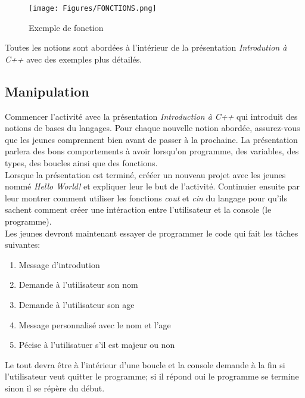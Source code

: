 \documentclass[]{report}
\begin{document}
\begin{adjustwidth}{1.5cm}{0cm}
\begin{figure}[!h]
	\centering
	\texttt{[image: Figures/FONCTIONS.png]}
	\caption{Exemple de fonction}
	\label{hw:fig:fonctions}
\end{figure}

Toutes les notions sont abordées à l'intérieur de la présentation \textit{Introdution à C++} avec des exemples plus détailés.
\subsection*{\Large{Manipulation}}
\vspace{-5mm}\makebox[0.917\textwidth]{\hrulefill}\vspace{3mm}

Commencer l'activité avec la présentation \textit{Introduction à C++} qui introduit des notions de bases du langages. Pour chaque nouvelle notion abordée, assurez-vous que les jeunes comprennent bien avant de passer à la prochaine. La présentation parlera des bons comportements à avoir lorsqu'on programme, des variables, des types, des boucles ainsi que des fonctions.
\\

Lorsque la présentation est terminé, crééer un nouveau projet avec les jeunes nommé \textit{Hello World!} et expliquer leur le but de l'activité. Continuier ensuite par leur montrer comment utiliser les fonctions \textit{cout} et \textit{cin} du langage pour qu'ils sachent comment créer une intéraction entre l'utilisateur et la console (le programme). 
\\

Les jeunes devront maintenant essayer de programmer le code qui fait les tâches suivantes:
\begin{enumerate}
	\item Message d'introdution\\
	\item Demande à l'utilisateur son nom\\
	\item Demande à l'utilisateur son age\\
	\item Message personnalisé avec le nom et l'age\\
	\item Pécise à l'utilisatuer s'il est majeur ou non\\
\end{enumerate}
Le tout devra être à l'intérieur d'une boucle et la console demande à la fin si l'utilisateur veut quitter le programme; si il répond oui le programme se termine sinon il se répère du début.


\end{adjustwidth}
\end{document}
